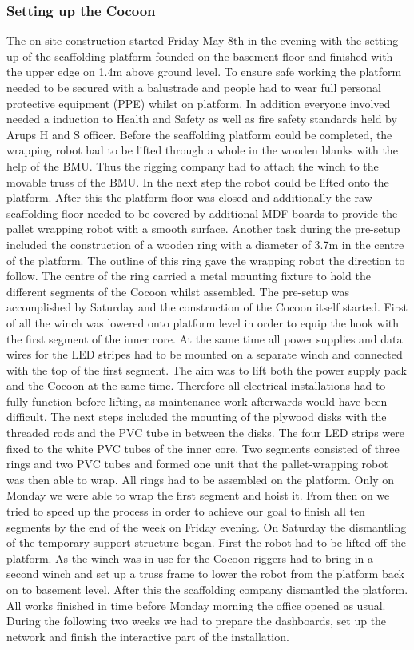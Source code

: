 \subsubsection*{Setting up the Cocoon}

The on site construction started Friday May 8th in the evening with the setting up of the scaffolding platform founded on the basement floor and finished with the upper edge on 1.4m above ground level. To ensure safe working the platform needed to be secured with a balustrade and people had to wear full personal protective equipment (PPE) whilst on platform. In addition everyone involved needed a induction to Health and Safety as well as fire safety standards held by Arups H and S officer.
Before the scaffolding platform could be completed, the wrapping robot had to be lifted through a whole in the wooden blanks with the help of the BMU. Thus the rigging company had to attach the winch to the movable truss of the BMU. In the next step the robot could be lifted onto the platform. After this the platform floor was closed and additionally the raw scaffolding floor needed to be covered by additional MDF boards to provide the pallet wrapping robot with a smooth surface. 
Another task during the pre-setup included the construction of a wooden ring with a diameter of 3.7m in the centre of the platform. The outline of this ring gave the wrapping robot the direction to follow. The centre of the ring carried a metal mounting fixture to hold the different segments of the Cocoon whilst assembled.
The pre-setup was accomplished by Saturday and the construction of the Cocoon itself started. First of all the winch was lowered onto platform level in order to equip the hook with the first segment of the inner core. At the same time all power supplies and data wires for the LED stripes had to be mounted on a separate winch and connected with the top of the first segment. The aim was to lift both the power supply pack and the Cocoon at the same time. Therefore all electrical installations had to fully function before lifting, as maintenance work afterwards would have been difficult. The next steps included the mounting of the plywood disks with the threaded rods and the PVC tube in between the disks. The four LED strips were fixed to the white PVC tubes of the inner core. 
Two segments consisted of three rings and two PVC tubes and formed one unit that the pallet-wrapping robot was then able to wrap. All rings had to be assembled on the platform.
Only on Monday we were able to wrap the first segment and hoist it. From then on we tried to speed up the process in order to achieve our goal to finish all ten segments by the end of the week on Friday evening.
On Saturday the dismantling of the temporary support structure began. First the robot had to be lifted off the platform. As the winch was in use for the Cocoon riggers had to bring in a second winch and set up a truss frame to lower the robot from the platform back on to basement level. After this the scaffolding company dismantled the platform. 
All works finished in time before Monday morning the office opened as usual. During the following two weeks we had to prepare the dashboards, set up the network and finish the interactive part of the installation.

